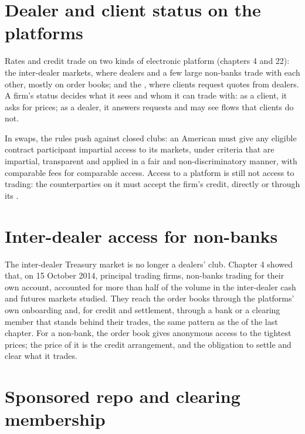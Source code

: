 \section{Dealer and client status on the platforms}

Rates and credit trade on two kinds of electronic platform (chapters 4 and 22): the
inter-dealer markets, where dealers and a few large non-banks trade with each other,
mostly on order books; and the , where clients request quotes
from dealers. A firm's status decides what it sees and whom it can trade with: as a
client, it asks for prices; as a dealer, it answers requests and may see flows that
clients do not.

In swaps, the rules push against closed clubs: an American  must
give any eligible contract participant impartial access to its markets, under criteria
that are impartial, transparent and applied in a fair and non-discriminatory manner,
with comparable fees for comparable access. Access to a platform is still not access
to trading: the counterparties on it must accept the firm's credit, directly or
through its .

\section{Inter-dealer access for non-banks}

The inter-dealer Treasury market is no longer a dealers' club. Chapter 4 showed that, on
15 October 2014, principal trading firms, non-banks trading for their own account,
accounted for more than half of the volume in the inter-dealer cash and futures
markets studied. They reach the order books through the platforms' own onboarding and,
for credit and settlement, through a bank or a clearing member that stands behind their
trades, the same pattern as the  of the last chapter. For a
non-bank, the order book gives anonymous access to the tightest prices; the price of
it is the credit arrangement, and the obligation to settle and clear what it trades.

\section{Sponsored repo and clearing membership}

